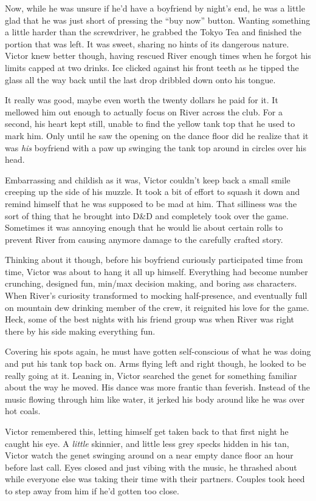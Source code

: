 Now, while he was unsure if he'd have a boyfriend by night's end, he was
a little glad that he was just short of pressing the ``buy now'' button.
Wanting something a little harder than the screwdriver, he grabbed the
Tokyo Tea and finished the portion that was left. It was sweet, sharing
no hints of its dangerous nature. Victor knew better though, having
rescued River enough times when he forgot his limits capped at two
drinks. Ice clicked against his front teeth as he tipped the glass all
the way back until the last drop dribbled down onto his tongue.

It really was good, maybe even worth the twenty dollars he paid for it.
It mellowed him out enough to actually focus on River across the club.
For a second, his heart kept still, unable to find the yellow tank top
that he used to mark him. Only until he saw the opening on the dance
floor did he realize that it was \emph{his} boyfriend with a paw up
swinging the tank top around in circles over his head.

Embarrassing and childish as it was, Victor couldn't keep back a small
smile creeping up the side of his muzzle. It took a bit of effort to
squash it down and remind himself that he was supposed to be mad at him.
That silliness was the sort of thing that he brought into D\&D and
completely took over the game. Sometimes it was annoying enough that he
would lie about certain rolls to prevent River from causing anymore
damage to the carefully crafted story.

Thinking about it though, before his boyfriend curiously participated
time from time, Victor was about to hang it all up himself. Everything
had become number crunching, designed fun, min/max decision making, and
boring ass characters. When River's curiosity transformed to mocking
half-presence, and eventually full on mountain dew drinking member of
the crew, it reignited his love for the game. Heck, some of the best
nights with his friend group was when River was right there by his side
making everything fun.

Covering his spots again, he must have gotten self-conscious of what he
was doing and put his tank top back on. Arms flying left and right
though, he looked to be really going at it. Leaning in, Victor searched
the genet for something familiar about the way he moved. His dance was
more frantic than feverish. Instead of the music flowing through him
like water, it jerked his body around like he was over hot coals.

Victor remembered this, letting himself get taken back to that first
night he caught his eye. A \emph{little} skinnier, and little less grey
specks hidden in his tan, Victor watch the genet swinging around on a
near empty dance floor an hour before last call. Eyes closed and just
vibing with the music, he thrashed about while everyone else was taking
their time with their partners. Couples took heed to step away from him
if he'd gotten too close.

